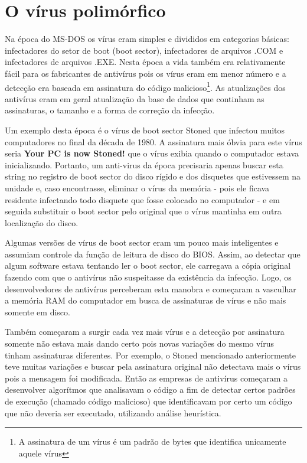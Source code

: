 \chapter{O vírus polimórfico}

Na época do MS-DOS os vírus eram simples e divididos em categorias básicas: infectadores do setor de boot (boot sector\cite{wiki:5}), infectadores de arquivos .COM e infectadores de arquivos .EXE. Nesta época a vida também era relativamente fácil para os fabricantes de antivírus pois os vírus eram em menor número e a detecção era baseada em assinatura do código malicioso\footnote{A assinatura de um vírus é um padrão de bytes que identifica unicamente aquele vírus}. As atualizações dos antivírus eram em geral atualização da base de dados que continham as assinaturas, o tamanho e a forma de correção da infecção.

Um exemplo desta época é o vírus de boot sector Stoned\cite{wiki:6} que infectou muitos computadores no final da década de 1980. A assinatura mais óbvia para este vírus seria \textbf{Your PC is now Stoned!} que o vírus exibia quando o computador estava inicializando. Portanto, um anti-virus da época precisaria apenas buscar esta string no registro de boot sector do disco rígido e dos disquetes que estivessem na unidade e, caso encontrasse, eliminar o vírus da memória - pois ele ficava residente infectando todo disquete que fosse colocado no computador - e em seguida substituir o boot sector pelo original que o vírus mantinha em outra localização do disco.

Algumas versões de vírus de boot sector eram um pouco mais inteligentes e assumiam controle da função de leitura de disco do BIOS. Assim, ao detectar que algum software estava tentando ler o boot sector, ele carregava a cópia original fazendo com que o antivírus não suspeitasse da existência da infecção. Logo, os desenvolvedores de antivírus perceberam esta manobra e começaram a vasculhar a memória RAM do computador em busca de assinaturas de vírus e não mais somente em disco.

Também começaram a surgir cada vez mais vírus e a detecção por assinatura somente não estava mais dando certo pois novas variações do mesmo vírus tinham assinaturas diferentes. Por exemplo, o Stoned mencionado anteriormente teve muitas variações e buscar pela assinatura original não detectava mais o vírus pois a mensagem foi modificada. Então as empresas de antivírus começaram a desenvolver algorítmos que analisavam o código a fim de detectar certos padrões de execução (chamado código malicioso) que identificavam por certo um código que não deveria ser executado, utilizando análise heurística\cite{wiki:7,avg:1}.

